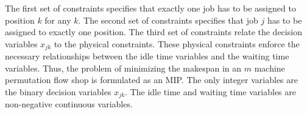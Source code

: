 The first set of constraints specifies that exactly one job has to be assigned to
position $k$ for any $k$. The second set of constraints specifies that job $j$ has to be
assigned to exactly one position. The third set of constraints relate the decision
variables $x_{jk}$ to the physical constraints. These physical constraints enforce the
necessary relationships between the idle time variables and the waiting time
variables. Thus, the problem of minimizing the makespan in an $m$ machine
permutation flow shop is formulated as an MIP. The only integer variables
are the binary decision variables $x_{jk}$. The idle time and waiting time
variables are non-negative continuous variables.